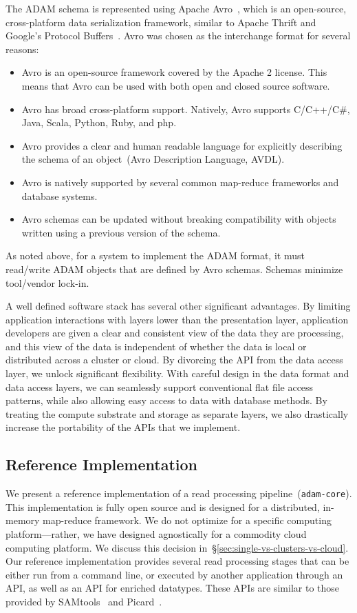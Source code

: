 \documentclass{bioinfo}
\begin{document}
The ADAM schema is represented using Apache Avro~\citep{avro}, which is an open-source, cross-platform data serialization framework, similar
to Apache Thrift and Google's Protocol Buffers~\citep{thrift, protobuf}. Avro was chosen as the interchange format for several reasons:

\begin{itemize}
\item Avro is an open-source framework covered by the Apache 2 license. This means that Avro can be used with both open and closed source software.
\item Avro has broad cross-platform support. Natively, Avro supports C/C++/C\#, Java, Scala, Python, Ruby, and php.
\item Avro provides a clear and human readable language for explicitly describing the schema of an object~(Avro Description Language, AVDL).
\item Avro is natively supported by several common map-reduce frameworks and database systems.
\item Avro schemas can be updated without breaking compatibility with objects written using a previous version of the schema.
\end{itemize}

As noted above, for a system to implement the ADAM format, it must read/write ADAM objects that are defined by Avro schemas. Schemas minimize
tool/vendor lock-in.

A well defined software stack has several other significant advantages. By limiting application interactions with layers lower than the presentation layer,
application developers are given a clear and consistent view of the data they are processing, and this view of the data is independent of whether the data
is local or distributed across a cluster or cloud. By divorcing the API from the data access layer, we unlock significant flexibility. With careful design in the data
format and data access layers, we can seamlessly support conventional flat file access patterns, while also allowing easy access to data with database methods.
By treating the compute substrate and storage as separate layers, we also drastically increase the portability of the APIs that we implement.

\subsection{Reference Implementation}
\label{sec:reference-implementation}

We present a reference implementation of a read processing pipeline~(\texttt{adam-core}). This implementation is fully open source
and is designed for a distributed, in-memory map-reduce framework. We do not optimize for a specific computing platform---rather, we have designed
agnostically for a commodity cloud computing platform. We discuss this decision in~\S\ref{sec:single-vs-clusters-vs-cloud}. Our reference
implementation provides several read processing stages that can be either run from a command line, or executed by another application through
an API, as well as an API for enriched datatypes. These APIs are similar to those provided by SAMtools~\citep{li09} and Picard~\citep{picard}.
\end{document}
